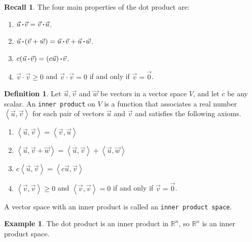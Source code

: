 \documentclass{beamer}
\newcommand{\R}{\mathbb{R}}
\newcommand{\vecu}{\vec{u}}
\newcommand{\fn}{\insertframenumber}
\newcommand{\proj}{\operatorname{proj}}
\newcommand{\ip}[2]{\left\langle #1,#2\right\rangle}
\newcommand{\dotp}{\,{\boldsymbol{\cdot}\hspace*{.01in}}}
\theoremstyle{definition}
\newtheorem{exercise}{Exercise}
\newtheorem*{defn}{Definition}
\newtheorem*{exa}{Example}
\newtheorem*{recall}{Recall}
\renewcommand{\emph}[1]{{\color{blue}\texttt{#1}}}
\begin{document}
\begin{frame}{\fn}
	\begin{recall}
		The four main properties of the dot product are:
		\begin{enumerate}[label=\textbf{\arabic*.}]
			\item $\vec u\dotp\vec v=\vec v\dotp\vec u$.
			\item $\vec u\dotp(\vec v+\vec w)=\vec u\dotp\vec v+\vec u\dotp \vec w$.
			\item $c(\vec u\dotp \vec v)=(c\vec u)\dotp\vec v$.
			\item $\vec v\cdot\vec v\geq 0$ and $\vec v\cdot\vec v=0$ if and only if $\vec v=\vec 0$.
		\end{enumerate}
	\end{recall}
\end{frame}
\begin{frame}{\fn}
	\begin{defn}
		Let $\vec u,\vec v$ and $\vec w$ be vectors in a vector space $V$, and let $c$ be any scalar.  An \emph{inner product} on $V$ is a function that associates a real number $\ip{\vecu}{\vec v}$ for each pair of vectors $\vec u$ and $\vec v$ and satisfies the following axioms.
		\begin{enumerate}[label=\textbf{\arabic*.}]
			\item $\ip{\vec u}{\vec v}=\ip{\vec v}{\vec u}$
			\item $\ip{\vec u}{\vec v+\vec w}=\ip{\vec u}{\vec v}+\ip{\vec u}{\vec w}$
			\item $c\ip{\vec u}{\vec v}=\ip{c\vec u}{\vec v}$
			\item $\ip{\vec v}{\vec v}\geq 0$ and $\ip{\vec v}{\vec v}=0$ if and only if $\vec v=\vec 0$.
		\end{enumerate}
	
		A vector space with an inner product is called an \emph{inner product space}.
	\end{defn}
	\begin{exa}
		The dot product is an inner product in $\R^n$, so $\R^n$ is an inner product space.
	\end{exa}
\end{frame}
\end{document}
